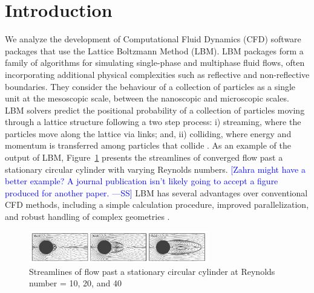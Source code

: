 \documentclass[final, 3p, times, authoryear]{elsarticle}
\newcommand{\authornote}[3]{\textcolor{#1}{[#3 ---#2]}}
\newcommand{\authornote}[3]{}
\newcommand{\wss}[1]{\authornote{blue}{SS}{#1}} %
\begin{document}

\section{Introduction}

We analyze the development of Computational Fluid Dynamics (CFD) software
packages that use the Lattice Boltzmann Method (LBM). LBM packages form a family
of algorithms for simulating single-phase and multiphase fluid flows, often
incorporating additional physical complexities \citep{chen1998lattice} such as
reflective and non-reflective boundaries. They consider the behaviour of a
collection of particles as a single unit at the mesoscopic scale, between the
nanoscopic and microscopic scales. LBM solvers predict the positional
probability of a collection of particles moving through a lattice structure
following a two step process: i) streaming, where the particles
move along the lattice via links; and, ii) colliding, where energy and
momentum is transferred among particles that collide \citep{bao2011lattice}. As
an example of the output of LBM, Figure~\ref{circularflow} presents the streamlines of
converged flow past a stationary circular cylinder with varying Reynolds numbers.
\wss{Zahra might have a better example?  A journal publication isn't likely
going to accept a figure produced for another paper.}  LBM has several
advantages over conventional CFD methods, including a simple calculation
procedure, improved parallelization, and robust handling of complex geometries
\citep{ganji2015application}.

\begin{figure}[h!]
	\begin{center}
		\includegraphics[width=0.7\textwidth]{./figures/circularflow}
		\caption{Streamlines of flow past a stationary circular cylinder at
		Reynolds number = 10, 20, and 40 \citep{chen2021phase}}
		\label{circularflow}
	\end{center}
\end{figure}
\end{document}
